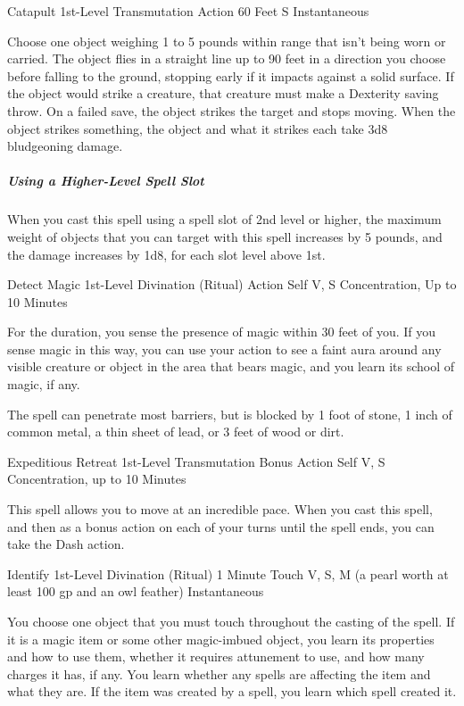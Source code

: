 \documentclass[letterpaper,openany,oneside,twocolumn]{book}
\begin{document}
\DndSpellHeader
  {Catapult}
  {1st-Level Transmutation}
  {Action}
  {60 Feet}
  {S}
  {Instantaneous}

Choose one object weighing 1 to 5 pounds within range that isn't being worn or carried. The object flies in a straight line up to 90 feet in a direction you choose before falling to the ground, stopping early if it impacts against a solid surface. If the object would strike a creature, that creature must make a Dexterity saving throw. On a failed save, the object strikes the target and stops moving. When the object strikes something, the object and what it strikes each take 3d8 bludgeoning damage.

\subparagraph*{Using a Higher-Level Spell Slot} When you cast this spell using a spell slot of 2nd level or higher, the maximum weight of objects that you can target with this spell increases by 5 pounds, and the damage increases by 1d8, for each slot level above 1st.

\DndSpellHeader
  {Detect Magic}
  {1st-Level Divination (Ritual)}
  {Action}
  {Self}
  {V, S}
  {Concentration, Up to 10 Minutes}

For the duration, you sense the presence of magic within 30 feet of you. If you sense magic in this way, you can use your action to see a faint aura around any visible creature or object in the area that bears magic, and you learn its school of magic, if any.

The spell can penetrate most barriers, but is blocked by 1 foot of stone, 1 inch of common metal, a thin sheet of lead, or 3 feet of wood or dirt.

\DndSpellHeader
  {Expeditious Retreat}
  {1st-Level Transmutation}
  {Bonus Action}
  {Self}
  {V, S}
  {Concentration, up to 10 Minutes}

This spell allows you to move at an incredible pace. When you cast this spell, and then as a bonus action on each of your turns until the spell ends, you can take the Dash action.

\DndSpellHeader
  {Identify}
  {1st-Level Divination (Ritual)}
  {1 Minute}
  {Touch}
  {V, S, M (a pearl worth at least 100 gp and an owl feather)}
  {Instantaneous}

You choose one object that you must touch throughout the casting of the spell. If it is a magic item or some other magic-imbued object, you learn its properties and how to use them, whether it requires attunement to use, and how many charges it has, if any. You learn whether any spells are affecting the item and what they are. If the item was created by a spell, you learn which spell created it.
\end{document}
